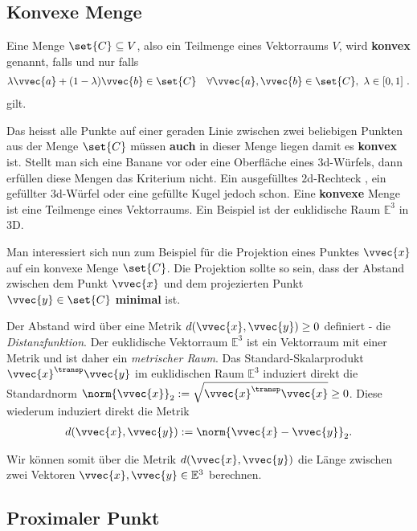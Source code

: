 \documentclass[
  british,
  12pt,
  paper=a4,
  twoside,
  titlepage=true,
  openright,
  abstract=on,
  toc=listofnumbered,
  numbers=noenddot,
  chapterprefix=true,
  headings=optiontohead,
  svgnames,
  dvipsnames]{scrreprt}
\begin{document}
\hypertarget{konvexe-menge}{%
\subsection{Konvexe Menge}\label{konvexe-menge}}

Eine Menge \(\set{C} \subseteq V\), also ein Teilmenge eines Vektorraums
\(V\), wird \textbf{konvex} genannt, falls und nur falls
\begin{align} \lambda \vvec{a} + (1-\lambda) \vvec{b} \in \set{C} \quad \forall \vvec{a},\vvec{b} \in \set{C}, \ \lambda \in [0,1] \ . \end{align}
gilt.

Das heisst alle Punkte auf einer geraden Linie zwischen zwei beliebigen
Punkten aus der Menge \(\set{C}\) müssen \textbf{auch} in dieser Menge
liegen damit es \textbf{konvex} ist. Stellt man sich eine Banane vor
oder eine Oberfläche eines \(3\)d-Würfels, dann erfüllen diese Mengen
das Kriterium nicht. Ein ausgefülltes \(2\)d-Rechteck , ein gefüllter
\(3\)d-Würfel oder eine gefüllte Kugel jedoch schon. Eine
\textbf{konvexe} Menge ist eine Teilmenge eines Vektorraums. Ein
Beispiel ist der euklidische Raum \(\mathbb{E}^3\) in \(3\)D.

Man interessiert sich nun zum Beispiel für die Projektion eines Punktes
\(\vvec{x}\) auf ein konvexe Menge \(\set{C}\). Die Projektion sollte so
sein, dass der Abstand zwischen dem Punkt \(\vvec{x}\) und dem
projezierten Punkt \(\vvec{y} \in \set{C}\) \textbf{minimal} ist.

Der Abstand wird über eine Metrik \(d(\vvec{x},\vvec{y}) \geq 0\)
definiert - die \emph{Distanzfunktion}. Der euklidische Vektorraum
\(\mathbb{E}^3\) ist ein Vektorraum mit einer Metrik und ist daher ein
\emph{metrischer Raum}. Das Standard-Skalarprodukt
\(\vvec{x}^\transp \vvec{y}\) im euklidischen Raum \(\mathbb{E}^3\)
induziert direkt die Standardnorm
\(\norm{\vvec{x}}_2 := \sqrt{\vvec{x}^\transp \vvec{x}} \geq 0\). Diese
wiederum induziert direkt die Metrik
\begin{align} d(\vvec{x},\vvec{y}) := \norm{\vvec{x} - \vvec{y}}_2. \end{align}

Wir können somit über die Metrik \(d(\vvec{x},\vvec{y})\) die Länge
zwischen zwei Vektoren \(\vvec{x},\vvec{y} \in \mathbb{E}^3\) berechnen.

\hypertarget{proximaler-punkt}{%
\subsection{Proximaler Punkt}\label{proximaler-punkt}}
\end{document}
